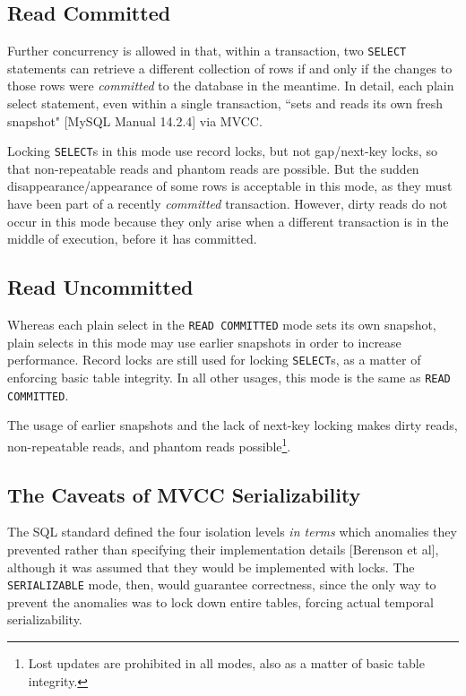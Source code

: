 \documentclass[12pt]{article} %
\begin{document}
\subsection{Read Committed}
Further concurrency is allowed in that, within a transaction, two \texttt{SELECT} statements can retrieve a different collection of rows if and only if the changes to those rows were \textsl{committed} to the database in the meantime. In detail, each plain select statement, even within a single transaction, ``sets and reads its own fresh snapshot" [MySQL Manual 14.2.4] via MVCC. 

Locking \texttt{SELECT}s in this mode use record locks, but not gap/next-key locks, so that non-repeatable reads and phantom reads are possible. But the sudden disappearance/appearance of some rows is acceptable in this mode, as they must have been part of a recently \textsl{committed} transaction. However, dirty reads do not occur in this mode because they only arise when a different transaction is in the middle of execution, before it has committed.

\subsection{Read Uncommitted}
Whereas each plain select in the \texttt{READ COMMITTED} mode sets its own snapshot, plain selects in this mode may use earlier snapshots in order to increase performance. Record locks are still used for locking \texttt{SELECT}s, as a matter of enforcing basic table integrity. In all other usages, this mode is the same as \texttt{READ COMMITTED}.

The usage of earlier snapshots and the lack of next-key locking makes dirty reads, non-repeatable reads, and phantom reads possible\footnote{Lost updates are prohibited in all modes, also as a matter of basic table integrity.}.

\subsection{The Caveats of MVCC Serializability}
The SQL standard defined the four isolation levels \textsl{in terms} which anomalies they prevented rather than specifying their implementation details [Berenson et al], although it was assumed that they would be implemented with locks. The \texttt{SERIALIZABLE} mode, then, would guarantee correctness, since the only way to prevent the anomalies was to lock down entire tables, forcing actual temporal serializability.
\end{document}
